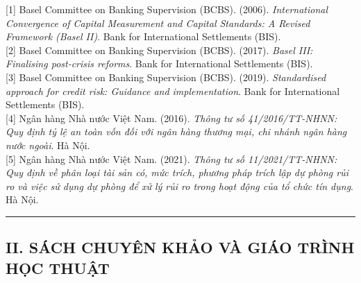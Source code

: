 \documentclass[
  13pt,
  a4paper,
]{report}
\begin{document}
{[}1{]} Basel Committee on Banking Supervision (BCBS). (2006).
\emph{International Convergence of Capital Measurement and Capital
Standards: A Revised Framework (Basel II)}. Bank for International
Settlements (BIS).\\
{[}2{]} Basel Committee on Banking Supervision (BCBS). (2017).
\emph{Basel III: Finalising post-crisis reforms}. Bank for International
Settlements (BIS).\\
{[}3{]} Basel Committee on Banking Supervision (BCBS). (2019).
\emph{Standardised approach for credit risk: Guidance and
implementation}. Bank for International Settlements (BIS).\\
{[}4{]} Ngân hàng Nhà nước Việt Nam. (2016). \emph{Thông tư số
41/2016/TT-NHNN: Quy định tỷ lệ an toàn vốn đối với ngân hàng thương
mại, chi nhánh ngân hàng nước ngoài}. Hà Nội.\\
{[}5{]} Ngân hàng Nhà nước Việt Nam. (2021). \emph{Thông tư số
11/2021/TT-NHNN: Quy định về phân loại tài sản có, mức trích, phương
pháp trích lập dự phòng rủi ro và việc sử dụng dự phòng để xử lý rủi ro
trong hoạt động của tổ chức tín dụng}. Hà Nội.

\begin{center}\rule{0.5\linewidth}{0.5pt}\end{center}

\subsection{II. SÁCH CHUYÊN KHẢO VÀ GIÁO TRÌNH HỌC
THUẬT}\label{ii.-suxe1ch-chuyuxean-khux1ea3o-vuxe0-giuxe1o-truxecnh-hux1ecdc-thuux1eadt}
\end{document}
